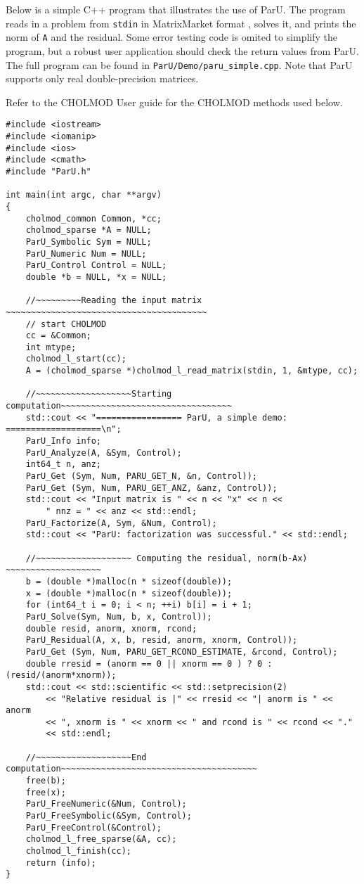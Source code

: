 \documentclass[12pt]{article}
\begin{document}
Below is a simple C++ program that illustrates the use of ParU.  The program
reads in a problem from \verb'stdin' in MatrixMarket format
\cite{BoisvertPozoRemingtonBarrettDongarra97}, solves it, and prints the norm
of \verb'A' and the residual.  Some error testing code is omited to simplify
the program, but a robust user application should check the return values from
ParU.  The full program can be found in \verb'ParU/Demo/paru_simple.cpp'.  Note
that ParU supports only real double-precision matrices.

Refer to the CHOLMOD User guide for the CHOLMOD methods used below.

\begin{verbatim}
#include <iostream>
#include <iomanip>
#include <ios>
#include <cmath>
#include "ParU.h"

int main(int argc, char **argv)
{
    cholmod_common Common, *cc;
    cholmod_sparse *A = NULL;
    ParU_Symbolic Sym = NULL;
    ParU_Numeric Num = NULL;
    ParU_Control Control = NULL;
    double *b = NULL, *x = NULL;

    //~~~~~~~~~Reading the input matrix ~~~~~~~~~~~~~~~~~~~~~~~~~~~~~~~~~~~~~~~~
    // start CHOLMOD
    cc = &Common;
    int mtype;
    cholmod_l_start(cc);
    A = (cholmod_sparse *)cholmod_l_read_matrix(stdin, 1, &mtype, cc);

    //~~~~~~~~~~~~~~~~~~~Starting computation~~~~~~~~~~~~~~~~~~~~~~~~~~~~~~~~~~
    std::cout << "================= ParU, a simple demo: ===================\n";
    ParU_Info info;
    ParU_Analyze(A, &Sym, Control);
    int64_t n, anz;
    ParU_Get (Sym, Num, PARU_GET_N, &n, Control));
    ParU_Get (Sym, Num, PARU_GET_ANZ, &anz, Control));
    std::cout << "Input matrix is " << n << "x" << n <<
        " nnz = " << anz << std::endl;
    ParU_Factorize(A, Sym, &Num, Control);
    std::cout << "ParU: factorization was successful." << std::endl;

    //~~~~~~~~~~~~~~~~~~~ Computing the residual, norm(b-Ax) ~~~~~~~~~~~~~~~~~~~
    b = (double *)malloc(n * sizeof(double));
    x = (double *)malloc(n * sizeof(double));
    for (int64_t i = 0; i < n; ++i) b[i] = i + 1;
    ParU_Solve(Sym, Num, b, x, Control));
    double resid, anorm, xnorm, rcond;
    ParU_Residual(A, x, b, resid, anorm, xnorm, Control));
    ParU_Get (Sym, Num, PARU_GET_RCOND_ESTIMATE, &rcond, Control);
    double rresid = (anorm == 0 || xnorm == 0 ) ? 0 : (resid/(anorm*xnorm));
    std::cout << std::scientific << std::setprecision(2)
        << "Relative residual is |" << rresid << "| anorm is " << anorm
        << ", xnorm is " << xnorm << " and rcond is " << rcond << "."
        << std::endl;

    //~~~~~~~~~~~~~~~~~~~End computation~~~~~~~~~~~~~~~~~~~~~~~~~~~~~~~~~~~~~~~
    free(b);
    free(x);
    ParU_FreeNumeric(&Num, Control);
    ParU_FreeSymbolic(&Sym, Control);
    ParU_FreeControl(&Control);
    cholmod_l_free_sparse(&A, cc);
    cholmod_l_finish(cc);
    return (info);
}
\end{verbatim}
\end{document}
